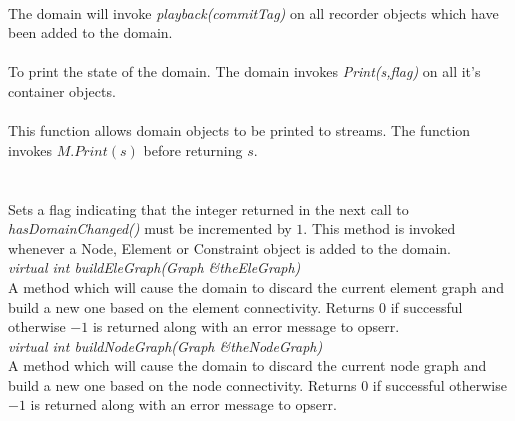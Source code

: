 \\
The domain will invoke {\em playback(commitTag)} on all recorder
objects which have been added to the domain.\\

\\
To print the state of the domain. The domain invokes {\em Print(s,flag)} on
all it's container objects. \\


\\  
This function allows domain objects to be printed to streams. The
function invokes $M.Print(s)$ before returning $s$. \\

  \\
\\
Sets a flag indicating that the integer returned in the next call to 
{\em hasDomainChanged()} must be incremented by $1$. This method is
invoked whenever a Node, Element or Constraint object is added to the
domain. \\ 

{\em virtual int buildEleGraph(Graph \&theEleGraph)} \\
A method which will cause the domain to discard the current element
graph and build a new one based on the element connectivity. Returns
$0$ if successful otherwise $-1$ is returned along with an error
message to opserr. \\

{\em virtual int buildNodeGraph(Graph \&theNodeGraph)} \\
A method which will cause the domain to discard the current node
graph and build a new one based on the node connectivity. Returns
$0$ if successful otherwise $-1$ is returned along with an error
message to opserr. \\





